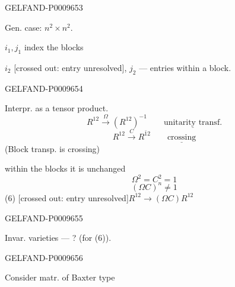 \begin{GelfandAdjacentEvidence}{GELFAND-P000965}{3}

\begin{flushright}Gen. case: $n^2\times n^2$.\end{flushright}

$i_1,j_1$ index the blocks

$i_2$ [crossed out: entry unresolved], $j_2$ --- entries within a block.
\end{GelfandAdjacentEvidence}
\begin{GelfandAdjacentEvidence}{GELFAND-P000965}{4}


Interpr. as a tensor product.
\begin{equation*}
 R^{12}\overset{\Omega}{\longrightarrow}(R^{12})^{-1}
 \qquad\underline{\text{unitarity transf.}}\tag{2}
\end{equation*}
\begin{equation*}
 R^{12}\overset{C}{\longrightarrow}R^{\bar{1}2}
 \qquad\underline{\text{crossing}}\tag{3}
\end{equation*}
(Block transp. is crossing)

within the blocks it is unchanged
\begin{equation*}
 \Omega^2=C^2=1\tag{4}
\end{equation*}
\begin{equation*}
 (\Omega C)^n\ne1\tag{5}
\end{equation*}
(6) [crossed out: entry unresolved]\quad $R^{12}\longrightarrow(\Omega C)R^{12}$
\end{GelfandAdjacentEvidence}
\begin{GelfandAdjacentEvidence}{GELFAND-P000965}{5}


Invar. varieties --- ? (for (6)).
\end{GelfandAdjacentEvidence}
\begin{GelfandAdjacentEvidence}{GELFAND-P000965}{6}


Consider matr. of Baxter type
\end{GelfandAdjacentEvidence}
